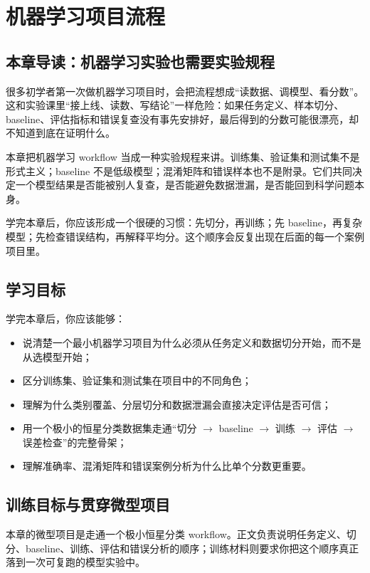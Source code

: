 \chapter{机器学习项目流程}

\section{本章导读：机器学习实验也需要实验规程}

很多初学者第一次做机器学习项目时，会把流程想成“读数据、调模型、看分数”。这和实验课里“接上线、读数、写结论”一样危险：如果任务定义、样本切分、baseline、评估指标和错误复查没有事先安排好，最后得到的分数可能很漂亮，却不知道到底在证明什么。

本章把机器学习 workflow 当成一种实验规程来讲。训练集、验证集和测试集不是形式主义；baseline 不是低级模型；混淆矩阵和错误样本也不是附录。它们共同决定一个模型结果是否能被别人复查，是否能避免数据泄漏，是否能回到科学问题本身。

学完本章后，你应该形成一个很硬的习惯：先切分，再训练；先 baseline，再复杂模型；先检查错误结构，再解释平均分。这个顺序会反复出现在后面的每一个案例项目里。

\section{学习目标}

学完本章后，你应该能够：

\begin{itemize}
    \item 说清楚一个最小机器学习项目为什么必须从任务定义和数据切分开始，而不是从选模型开始；
    \item 区分训练集、验证集和测试集在项目中的不同角色；
    \item 理解为什么类别覆盖、分层切分和数据泄漏会直接决定评估是否可信；
    \item 用一个极小的恒星分类数据集走通“切分 $\rightarrow$ baseline $\rightarrow$ 训练 $\rightarrow$ 评估 $\rightarrow$ 误差检查”的完整骨架；
    \item 理解准确率、混淆矩阵和错误案例分析为什么比单个分数更重要。
\end{itemize}

\section{训练目标与贯穿微型项目}

本章的微型项目是走通一个极小恒星分类 workflow。正文负责说明任务定义、切分、baseline、训练、评估和错误分析的顺序；训练材料则要求你把这个顺序真正落到一次可复跑的模型实验中。

